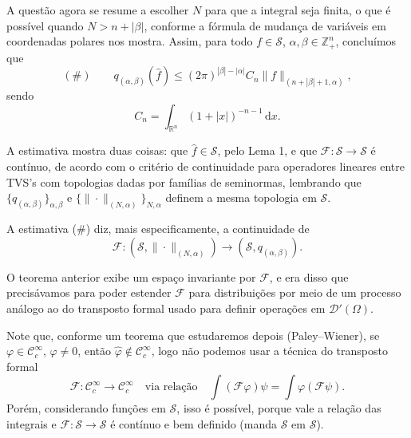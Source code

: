 \documentclass[../distribution_theory_notes.tex]{subfiles}
\begin{document}
\begin{proof*}
	A questão agora se resume a escolher \(N\) para que a integral seja finita, o que é possível quando \(N>n+|\beta |\), conforme a fórmula de mudança de variáveis em coordenadas polares nos mostra. Assim, para todo \(f\in \mathcal{S}\), \(\alpha ,\beta \in \mathbb{Z}_{+}^{n}\), concluímos que
	\[
		(\#)\qquad
		q_{(\alpha ,\beta )}(\hat{f})
		\leq (2\pi )^{|\beta |-|\alpha |}C_{n}
		\|f\|_{(n+|\beta |+1,\alpha )},
	\]
	sendo
	\[
		C_{n}=\int_{\mathbb{R}^{n}}(1+|x|)^{-n-1}\,\mathrm{d}x.
	\]

	A estimativa mostra duas coisas: que \(\hat{f}\in \mathcal{S}\), pelo Lema 1, e que \(\mathcal{F}:\mathcal{S}\to \mathcal{S}\) é contínuo, de acordo com o critério de continuidade para operadores lineares entre TVS's com topologias dadas por famílias de seminormas, lembrando que \(\{q_{(\alpha ,\beta )}\}_{\alpha ,\beta }\) e \(\{\|\cdot \|_{(N,\alpha )}\}_{N,\alpha }\) definem a mesma topologia em \(\mathcal{S}\). \qedsymbol
\end{proof*}

\begin{tcolorbox}[
		skin=enhanced,
		title=Observação,
		fonttitle=\bfseries,
		colframe=black,
		colbacktitle=cyan!75!white,
		colback=cyan!15,
		colbacklower=black,
		coltitle=black,
		drop fuzzy shadow
	]
	A estimativa (\(\#\)) diz, mais especificamente, a continuidade de
	\[
		\mathcal{F}:(\mathcal{S},\|\cdot \|_{(N,\alpha )})
		\longrightarrow (\mathcal{S},q_{(\alpha ,\beta )}).
	\]
\end{tcolorbox}

\begin{tcolorbox}[
		skin=enhanced,
		title=Observação,
		fonttitle=\bfseries,
		colframe=black,
		colbacktitle=cyan!75!white,
		colback=cyan!15,
		colbacklower=black,
		coltitle=black,
		drop fuzzy shadow
	]
	O teorema anterior exibe um espaço invariante por \(\mathcal{F}\), e era disso que precisávamos para poder estender \(\mathcal{F}\) para distribuições por meio de um processo análogo ao do transposto formal usado para definir operações em \(\mathcal{D}'(\Omega )\).

	Note que, conforme um teorema que estudaremos depois (Paley--Wiener), se \(\varphi \in \mathcal{C}_{c}^{\infty}\), \(\varphi \neq 0\), então \(\hat{\varphi }\notin \mathcal{C}_{c}^{\infty}\), logo não podemos usar a técnica do transposto formal
	\[
		\mathcal{F}:\mathcal{C}_{c}^{\infty}\longrightarrow \mathcal{C}_{c}^{\infty}
		\quad \text{via relação}\quad
		\int (\mathcal{F}\varphi )\psi =\int \varphi (\mathcal{F}\psi ).
	\]
	Porém, considerando funções em \(\mathcal{S}\), isso é possível, porque vale a relação das integrais e \(\mathcal{F}:\mathcal{S}\to \mathcal{S}\) é contínuo e bem definido (manda \(\mathcal{S}\) em \(\mathcal{S}\)).
\end{tcolorbox}
\end{document}
